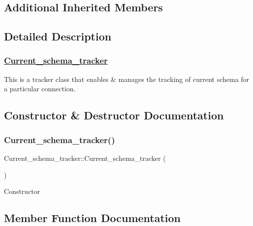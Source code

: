 \subsection*{Additional Inherited Members}


\subsection{Detailed Description}
\subsubsection*{\mbox{\hyperlink{classCurrent__schema__tracker}{Current\+\_\+schema\+\_\+tracker}} }

This is a tracker class that enables \& manages the tracking of current schema for a particular connection. 

\subsection{Constructor \& Destructor Documentation}
\mbox{\label{classCurrent__schema__tracker_a95e11e8c1510e1a9845d74f8dc99664f}} 
\subsubsection{\texorpdfstring{Current\+\_\+schema\+\_\+tracker()}{Current\_schema\_tracker()}}
{\footnotesize\ttfamily Current\+\_\+schema\+\_\+tracker\+::\+Current\+\_\+schema\+\_\+tracker (\begin{DoxyParamCaption}{ }\end{DoxyParamCaption})\hspace{0.3cm}{\ttfamily [inline]}}

Constructor 

\subsection{Member Function Documentation}
\mbox{\label{classCurrent__schema__tracker_adb85ededcff63655f491046f93a82cba}} 
